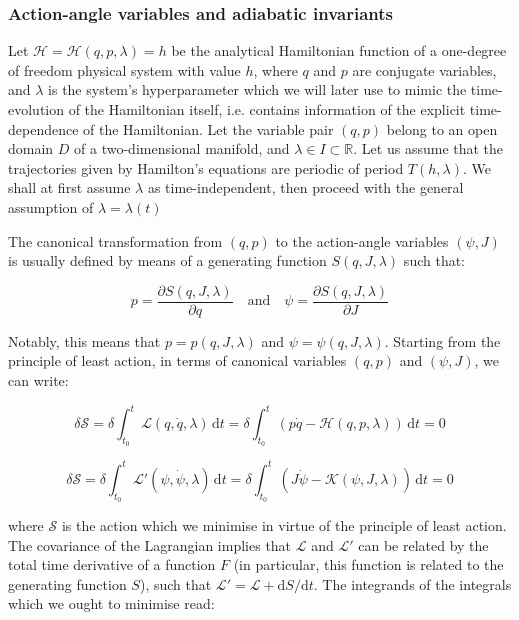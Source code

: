 \subsubsection{Action-angle variables and adiabatic invariants}

Let $\mathcal{H}=\mathcal{H}\left(q,p,\lambda\right)=h$ be the analytical Hamiltonian function of a one-degree of freedom physical system with value $h$, where $q$ and $p$ are conjugate variables, and $\lambda$ is the system's hyperparameter which we will later use to mimic the time-evolution of the Hamiltonian itself, i.e. contains information of the explicit time-dependence of the Hamiltonian. Let the variable pair $(q,p)$ belong to an open domain $D$ of a two-dimensional manifold, and $\lambda\in I\subset \mathbb{R}$. Let us assume that the trajectories given by Hamilton's equations are periodic of period $T(h,\lambda)$. We shall at first assume $\lambda$ as time-independent, then proceed with the general assumption of $\lambda=\lambda(t)$

\vspace*{2.5pt}

\quad The canonical transformation from $(q,p)$ to the action-angle variables $(\psi, J)$ is usually defined by means of a generating function $S(q,J,\lambda)$ such that:

\begin{equation*}
    p=\frac{\partial S(q,J,\lambda)}{\partial q}\quad\text{and}\quad \psi=\frac{\partial S(q,J,\lambda)}{\partial J}
\end{equation*}

Notably, this means that $p=p(q,J,\lambda)$ and $\psi=\psi(q,J,\lambda)$. Starting from the principle of least action, in terms of canonical variables $(q,p)$ and $(\psi, J)$, we can write:

\begin{equation*}
    \delta \mathcal{S}=\delta\int_{t_0}^{t}\mathcal{L}\left(q,\dot{q},\lambda\right)\,\mathrm{d}t=\delta\int_{t_0}^{t}\left(p\dot{q}-\mathcal{H}\left(q,p,\lambda\right)\right)\,\mathrm{d}t=0
\end{equation*}

\begin{equation*}
    \delta\mathcal{S}=\delta\int_{t_0}^t\mathcal{L}'(\psi,\dot{\psi},\lambda)\,\mathrm{d}t=\delta\int_{t_0}^{t}\left(J\dot{\psi}-\mathcal{K}\left(\psi,J,\lambda\right)\right)\,\mathrm{d}t=0
\end{equation*}

where $\mathcal{S}$ is the action which we minimise in virtue of the principle of least action. The covariance of the Lagrangian implies that $\mathcal{L}$ and $\mathcal{L}'$ can be related by the total time derivative of a function $F$ (in particular, this function is related to the generating function $S$), such that $\mathcal{L}'=\mathcal{L}+\mathrm{d}S/\mathrm{d}t$. The integrands of the integrals which we ought to minimise read:

